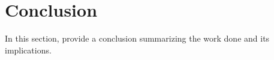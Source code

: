 \documentclass[12pt]{article}
\begin{document}
\section{Conclusion}
In this section, provide a conclusion summarizing the work done and its implications.



\end{document}
